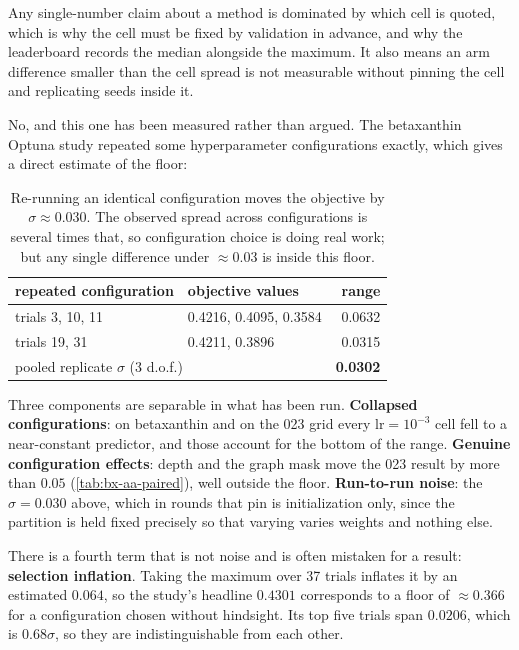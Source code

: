Any single-number claim about a method is dominated by which cell is quoted, which is why
the cell must be fixed by validation in advance, and why the leaderboard records the median
alongside the maximum. It also means an arm difference smaller than the cell spread is not
measurable without pinning the cell and replicating seeds inside it.

 No, and this one has been measured rather
than argued. The betaxanthin Optuna study repeated some hyperparameter configurations
exactly, which gives a direct estimate of the floor:

\begin{table}[htbp]
\centering\small
\begin{tabular}{llr}
\toprule
repeated configuration & objective values & range \\
\midrule
trials 3, 10, 11 & 0.4216, 0.4095, 0.3584 & 0.0632 \\
trials 19, 31    & 0.4211, 0.3896         & 0.0315 \\
\midrule
\multicolumn{2}{l}{pooled replicate $\sigma$ (3 d.o.f.)} & \textbf{0.0302} \\
\bottomrule
\end{tabular}
\caption[]{Re-running an identical configuration moves the objective by
$\sigma \approx 0.030$. The observed spread across configurations is several times that, so
configuration choice is doing real work; but any single difference under $\approx 0.03$ is
inside this floor.}
\label{tab:replicate-noise}
\end{table}

Three components are separable in what has been run. \textbf{Collapsed configurations}: on
betaxanthin and on the 023 grid every $\mathrm{lr} = 10^{-3}$ cell fell to a near-constant
predictor, and those account for the bottom of the range. \textbf{Genuine configuration
effects}: depth and the graph mask move the 023 result by more than $0.05$
(\cref{tab:bx-aa-paired}), well outside the floor. \textbf{Run-to-run noise}: the
$\sigma = 0.030$ above, which in rounds that pin  is
initialization only, since the partition is held fixed precisely so that varying 
varies weights and nothing else.

There is a fourth term that is not noise and is often mistaken for a result:
\textbf{selection inflation}. Taking the maximum over 37 trials inflates it by an estimated
$0.064$, so the study's headline $0.4301$ corresponds to a floor of $\approx 0.366$ for a
configuration chosen without hindsight. Its top five trials span $0.0206$, which is $0.68
\sigma$, so they are indistinguishable from each other.

